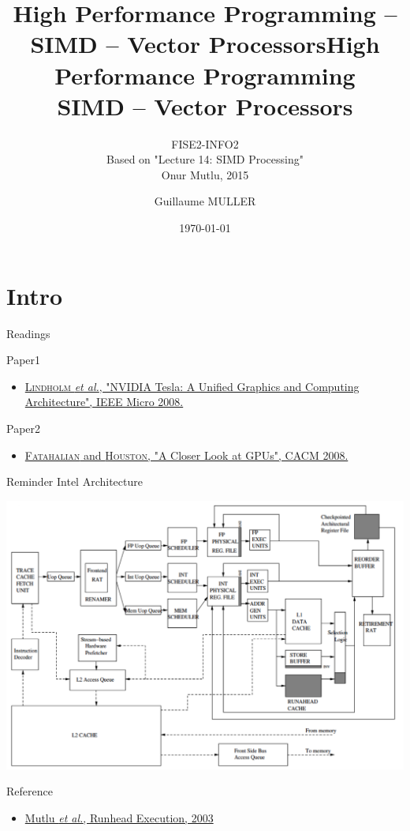 \documentclass[presentation]{beamer}
\author{Guillaume MULLER}
\date{\today}
\title{High Performance Programming -- SIMD -- Vector Processors}
\title[HPP -- SIMD -- Vector]{High Performance Programming\\SIMD -- Vector Processors}
\subtitle{FISE2-INFO2\\ {\tiny Based on "Lecture 14: SIMD Processing"\\Onur Mutlu, 2015}}
\begin{document}
\maketitle

\section*{Intro}
\label{sec:org92cedf9}

\begin{frame}[label={sec:org59488e5}]{Readings}
\begin{block}{Paper1}
\begin{itemize}
\item \href{https://people.cs.umass.edu/\~emery/classes/cmpsci691st/readings/Arch/gpu.pdf}{\textsc{Lindholm} \emph{et al.}, "NVIDIA Tesla: A Unified Graphics and Computing Architecture", IEEE Micro 2008.}
\end{itemize}
\end{block}
\begin{block}{Paper2}
\begin{itemize}
\item \href{https://www.researchgate.net/publication/220422248\_A\_closer\_look\_at\_GPUs/link/550041e60cf204d683b34481/download}{\textsc{Fatahalian} and \textsc{Houston}, "A Closer Look at GPUs", CACM 2008.}
\end{itemize}
\end{block}
\end{frame}


\begin{frame}[label={sec:org38bb992}]{Reminder Intel Architecture}
\begin{center}
\includegraphics[width=.9\linewidth]{./images/slides_SIMD_08_small.png}
\end{center}
\begin{block}{Reference}
\begin{itemize}
\item \small \href{https://users.ece.cmu.edu/\~omutlu/pub/mutlu\_hpca03.pdf}{Mutlu \emph{et al.}, Runhead Execution, 2003}
\end{itemize}
\end{block}
\end{frame}
\end{document}
